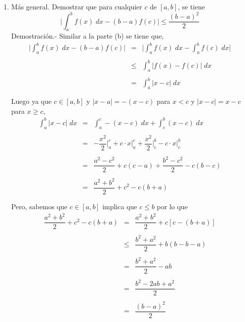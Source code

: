 \begin{enumerate}[\bfseries 1.]
\begin{enumerate}[\bfseries a)]
	    \item Más general. Demostrar que para cualquier $c$ de $[a,b]$, se tiene
		$$\bigg|\int_a^b f(x)\; dx - (b-a)f(c)\bigg|\leq \dfrac{(b-a)^2}{2}$$
		Demostración.-\; Similar a la parte (b) se tiene que,
		$$\begin{array}{rcl}
		    \bigg|\displaystyle\int_a^b f(x)\; dx - (b-a)f(c)\bigg|&=&\bigg|\displaystyle\int_a^b f(x)\; dx - \displaystyle\int_a^b f(c)\; dx\bigg|\\\\
									   &\leq &\displaystyle\int_a^b|f(x)-f(c)|\; dx\\\\
									   &=&\displaystyle\int_a^b |x-c|\; dx\\\\
		\end{array}$$
		Luego ya que $c\in [a,b]$ y $|x-a|=-(x-c)$ para $x<c$ y $|x-c|=x-c$ para $x\geq c$,
		$$\begin{array}{rcl}
		    \displaystyle\int_a^b|x-c|\; dx&=&\displaystyle\int_a^c -(x-c)\; dx + \int_c^b (x-c)\; dx\\\\
						   &=&-\dfrac{x^2}{2}\bigg|_a^c +c\cdot x\bigg|_a^c +\dfrac{x^2}{2}\bigg|_c^b - c\cdot x\bigg|_c^b\\\\
						   &=&\dfrac{a^2-c^2}{2}+c(c-a)+\dfrac{b^2-c^2}{2} - c(b-c)\\\\
						   &=&\dfrac{a^2+b^2}{2}+c^2-c(b+a)\\\\
		\end{array}$$
		Pero, sabemos que $c\in[a,b]$ implica que $c\leq b$ por lo que 
		$$\begin{array}{rcl}
		    \dfrac{a^2+b^2}{2}+c^2-c(b+a)&=&\dfrac{a^2+b^2}{2}+c[c-(b+a)]\\\\
		    &\leq&\dfrac{b^2+a^2}{2}+b(b-b-a)\\\\
		    &=&\dfrac{b^2+a^2}{2}-ab\\\\
		    &=&\dfrac{b^2-2ab+a^2}{2}\\\\
		    &=&\dfrac{(b-a)^2}{2}\\\\
		\end{array}$$

	\end{enumerate}

\end{enumerate}



